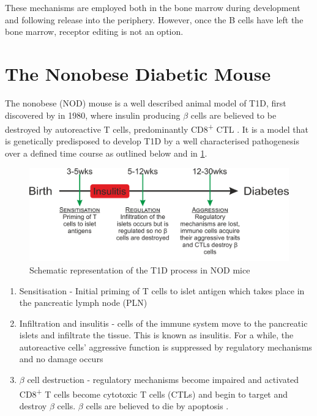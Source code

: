 These mechanisms are employed both in the bone marrow during development and following release into the periphery.
However, once the B cells have left the bone marrow, receptor editing is not an option.



\section{The Nonobese Diabetic Mouse}

The nonobese (NOD) mouse is a well described animal model of T1D, first discovered by \citet{Makino1980} in 1980, where insulin producing $\beta$ cells are believed to be destroyed by autoreactive T cells, predominantly CD8\textsuperscript{+} CTL \citep{Lieberman2003}.
It is a model that is genetically predisposed to develop T1D by a well characterised pathogenesis over a defined time course as outlined below and in \cref{fig:diseasecourse}.

\begin{figure}
\includegraphics[width=\textwidth]{Figures/NODdisease.png}
\caption{Schematic representation of the T1D process in NOD mice}
\label{fig:diseasecourse}
\end{figure}

\begin{enumerate}
\item Sensitisation - Initial priming of T cells to islet antigen which takes place in the pancreatic lymph node (PLN)
\item Infiltration and insulitis - cells of the immune system move to the pancreatic islets and infiltrate the tissue. This is known as insulitis. For a while, the autoreactive cells' aggressive function is suppressed by regulatory mechanisms and no damage occurs
\item $\beta$ cell destruction - regulatory mechanisms become impaired and activated CD8\textsuperscript{+} T cells become cytotoxic T cells (CTLs) and begin to target and destroy $\beta$ cells. $\beta$ cells are believed to die by apoptosis \citep{Cnop2005}.
\end{enumerate}

